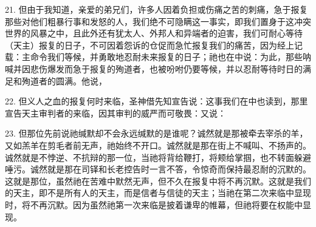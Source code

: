 21. 但由于我知道，亲爱的弟兄们，许多人因着负担或伤痛之苦的刺痛，急于报复那些对他们粗暴行事和发怒的人，我们绝不可隐瞒这一事实，即我们置身于这冲突世界的风暴之中，且此外还有犹太人、外邦人和异端者的迫害，我们可耐心等待（天主）报复的日子，不可因着怨诉的仓促而急忙报复我们的痛苦，因为经上记载：主命令我们等候，并勇敢地忍耐未来报复的日子；祂也在中说：为此，那些呐喊并因悲伤爆发而急于报复的殉道者，也被吩咐仍要等候，并以忍耐等待时日的满足和殉道者的圆满。他说，\par

22. 但义人之血的报复何时来临，圣神借先知宣告说：这事我们在中也读到，那里宣告天主审判者的来临，因其审判的威严而可敬畏：又说：\par

23. 但那位先前说祂缄默却不会永远缄默的是谁呢？诚然就是那被牵去宰杀的羊，又如羔羊在剪毛者前无声，祂始终不开口。诚然就是那在街上不喊叫、不扬声的。诚然就是不悖逆、不抗辩的那一位，当祂将背给鞭打，将颊给掌掴，也不转面躲避唾污。诚然就是那在司铎和长老控告时一言不答，令惊奇而保持最忍耐的沉默的。这就是那位，虽然祂在苦难中默然无声，但不久在报复中将不再沉默。这就是我们的天主，即不是所有人的天主，而是信者与信徒的天主；当祂在第二次来临中显现时，将不再沉默。因为虽然祂第一次来临是披着谦卑的帷幕，但祂将要在权能中显现。\par

